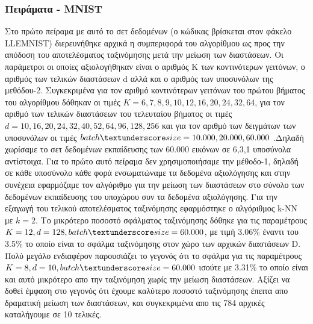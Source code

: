 \subsubsection{Πειράματα - \textlatin{MNIST}}
\par
Στο πρώτο πείραμα με αυτό το σετ δεδομένων (ο κώδικας βρίσκεται στον φάκελο \textlatin{LLE\textunderscore MNIST}) διερευνήθηκε αρχικά η συμπεριφορά του αλγορίθμου ως προς την απόδοση του αποτελέσματος ταξινόμησης μετά την μείωση των διαστάσεων. Οι παράμετροι οι οποίες αξιολογήθηκαν είναι ο αριθμός Κ των κοντινότερων γειτόνων, ο αριθμός των τελικών διαστάσεων \textlatin{d} αλλά και ο αριθμός των υποσυνόλων της μεθόδου-2. Συγκεκριμένα για τον αριθμό κοντινότερων γειτόνων του πρώτου βήματος του αλγορίθμου δόθηκαν οι τιμές $K = 6,7,8,9,10,12,16,20,24,32,64$, για τον αριθμό των τελικών διαστάσεων του τελευταίου βήματος οι τιμές $d = 10,16,20,24,32,40,52,64,96,128,256$ και για τον αριθμό των δειγμάτων των υποσυνόλων οι τιμές $batch\textunderscore size = 10.000,20.000,60.000$ .Δηλαδή χωρίσαμε το σετ δεδομένων εκπαίδευσης των 60.000 εικόνων σε 6,3,1 υποσύνολα αντίστοιχα. Για το πρώτο αυτό πείραμα δεν χρησιμοποιήσαμε την μέθοδο-1, δηλαδή σε κάθε υποσύνολο κάθε φορά ενσωματώναμε τα δεδομένα αξιολόγησης και στην συνέχεια εφαρμόζαμε τον αλγόριθμο για την μείωση των διαστάσεων στο σύνολο των δεδομένων εκπαίδευσης του υποχώρου συν τα δεδομένα αξιολόγησης. Για την εξαγωγή του τελικού αποτελέσματος ταξινόμησης εφαρμόστηκε ο αλγόριθμος \textlatin{k-NN} με $k=2$. Το μικρότερο ποσοστό σφάλματος ταξινόμησης δόθηκε για τις παραμέτρους $K=12, d=128, batch\textunderscore size=60.000$, με τιμή 3.06\% έναντι του 3.5\% το οποίο είναι το σφάλμα ταξινόμησης στον χώρο των αρχικών διαστάσεων \textlatin{D}. Πολύ μεγάλο ενδιαφέρον παρουσιάζει το γεγονός ότι το σφάλμα για τις παραμέτρους $K=8, d=10, batch\textunderscore size=60.000$ ισούτε με 3.31\% το οποίο είναι και αυτό μικρότερο απο την ταξινόμηση χωρίς την μείωση διαστάσεων. Αξίζει να δοθεί έμφαση στο γεγονός ότι έχουμε καλύτερο ποσοστό ταξινόμησης έπειτα απο δραματική μείωση των διαστάσεων, και συγκεκριμένα απο τις 784 αρχικές καταλήγουμε σε 10 τελικές. 
\par
